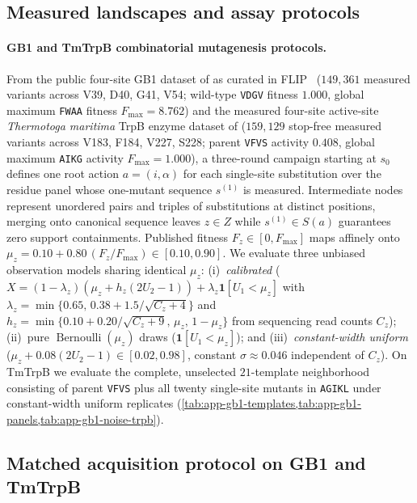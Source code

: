 \documentclass{article}
\theoremstyle{plain}
\theoremstyle{definition}
\begin{document}
\subsection{Measured landscapes and assay protocols}

\paragraph{GB1 and TmTrpB combinatorial mutagenesis protocols.}
From the public four-site GB1 dataset of \citet{wu2016gb1} as curated in FLIP~\citep{dallago2021flip} ($149{,}361$ measured variants across V39, D40, G41, V54; wild-type \texttt{VDGV} fitness $1.000$, global maximum \texttt{FWAA} fitness $F_{\max}=8.762$) and the measured four-site active-site \emph{Thermotoga maritima} TrpB enzyme dataset of \citet{johnston2024trpb} ($159{,}129$ stop-free measured variants across V183, F184, V227, S228; parent \texttt{VFVS} activity $0.408$, global maximum \texttt{AIKG} activity $F_{\max}=1.000$), a three-round campaign starting at $s_0$ defines one root action $a=(i,\alpha)$ for each single-site substitution over the residue panel whose one-mutant sequence $s^{(1)}$ is measured. Intermediate nodes represent unordered pairs and triples of substitutions at distinct positions, merging onto canonical sequence leaves $z\in Z$ while $s^{(1)}\in S(a)$ guarantees zero support containments. Published fitness $F_z\in[0,F_{\max}]$ maps affinely onto $\mu_z=0.10+0.80\,(F_z/F_{\max})\in[0.10,0.90]$. We evaluate three unbiased observation models sharing identical $\mu_z$: (i)~\emph{calibrated} ($X=(1-\lambda_z)(\mu_z+h_z(2U_2-1))+\lambda_z\mathbf{1}[U_1<\mu_z]$ with $\lambda_z=\min\{0.65,\,0.38+1.5/\sqrt{C_z+4}\}$ and $h_z=\min\{0.10+0.20/\sqrt{C_z+9},\,\mu_z,\,1-\mu_z\}$ from sequencing read counts $C_z$); (ii)~pure $\operatorname{Bernoulli}(\mu_z)$ draws ($\mathbf{1}[U_1<\mu_z]$); and (iii)~\emph{constant-width uniform} ($\mu_z+0.08(2U_2-1)\in[0.02,0.98]$, constant $\sigma\approx 0.046$ independent of $C_z$). On TmTrpB we evaluate the complete, unselected $21$-template neighborhood consisting of parent \texttt{VFVS} plus all twenty single-site mutants in \texttt{AGIKL} under constant-width uniform replicates (\cref{tab:app-gb1-templates,tab:app-gb1-panels,tab:app-gb1-noise-trpb}).

\subsection{Matched acquisition protocol on GB1 and TmTrpB}
\label{app:v13-protein}
\end{document}

